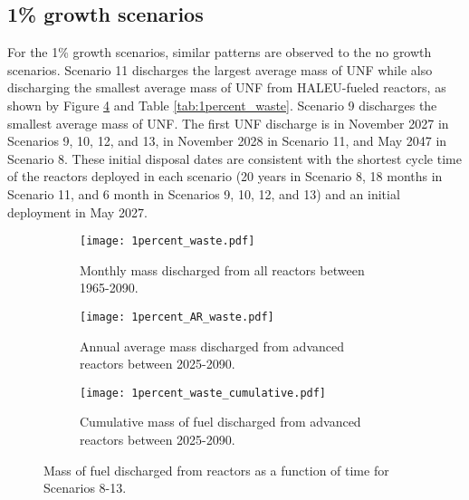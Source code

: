 \subsection{1\% growth scenarios}
For the 1\% growth scenarios, similar patterns are observed to the 
no growth scenarios. Scenario 11 discharges  
the largest average mass of \gls{UNF} while also discharging
the smallest average mass of \gls{UNF} from \gls{HALEU}-fueled 
reactors, as shown by  
Figure \ref{fig:1percent_waste} and Table \ref{tab:1percent_waste}. 
Scenario 9 discharges the smallest average mass of \gls{UNF}. The 
first \gls{UNF} discharge 
is in November 2027 in Scenarios 9, 10, 12, and 13, in 
November 2028 in Scenario 11, and May 2047 in Scenario 8. These initial 
disposal dates are consistent with the shortest cycle time of the 
reactors deployed in each scenario (20 years in Scenario 8, 18 months in 
Scenario 11, and 6 month in Scenarios 9, 10, 12, and 13) and an 
initial deployment in May 2027. 

\begin{figure}[h!]
    \centering
    \begin{subfigure}[b]{0.45\textwidth}
        \centering
        \texttt{[image: 1percent\_waste.pdf]}
        \caption{Monthly mass discharged from all reactors between 
        1965-2090.}
        \label{fig:1percent_all_waste}
    \end{subfigure}
    \hfill
    \begin{subfigure}[b]{0.45\textwidth}
        \centering
        \texttt{[image: 1percent\_AR\_waste.pdf]}
        \caption{Annual average mass discharged from advanced reactors 
        between 2025-2090.}
        \label{fig:1percent_AR_waste}
    \end{subfigure}
    \begin{subfigure}[b]{0.45\textwidth}
        \centering
        \texttt{[image: 1percent\_waste\_cumulative.pdf]}
        \caption{Cumulative mass of fuel discharged from advanced reactors 
        between 2025-2090.}
        \label{fig:1percent_waste_cumulative}
    \end{subfigure}
       \caption{Mass of fuel discharged from reactors 
       as a function of time for Scenarios 8-13. }
       \label{fig:1percent_waste}
\end{figure}


